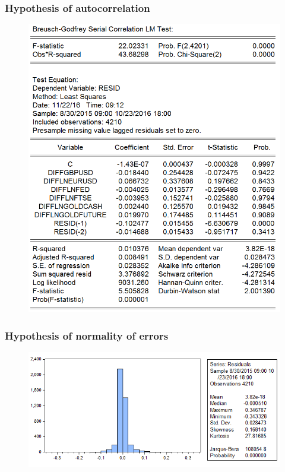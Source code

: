 \documentclass[11pt]{report}
\begin{document}
\subsubsection*{Hypothesis of autocorrelation}
\begin{figure}[!h]
\centering
\includegraphics[scale=0.5]{Appendix/chap2/17}
\end{figure}
\clearpage
\subsubsection*{Hypothesis of normality of errors}
\begin{figure}[!h]
\centering
\includegraphics[scale=1.5]{Appendix/chap2/18}
\end{figure}
\clearpage
\end{document}
